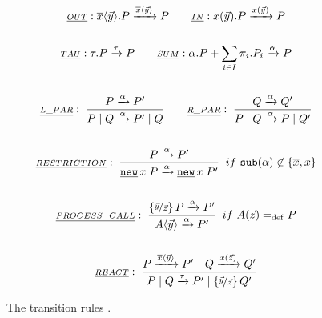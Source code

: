 \begin{figure}[H]
\begin{gather*}
\underline{\scriptstyle{OUT}}: \out{x}{\vec{y}}.P \transs{\out{x}{\vec{y}}} P
\quad\quad
\underline{\scriptstyle{IN}}: \inp{x}{\vec{y}}.P \transs{\inp{x}{\vec{y}}} P
\\\\
\underline{\scriptstyle{TAU}}: \tau.P \transs{\tau} P
\quad\quad
\underline{\scriptstyle{SUM}}: \procchoice{\alpha.P}{\procsum} \transs{\alpha} P
\\\\
\kalRule[]{L\_PAR}{}{P \transs{\alpha} P'}{\procpar{P}{Q} \transs{\alpha} \procpar{P'}{Q}}
\quad\quad
\kalRule[]{R\_PAR}{}{Q \transs{\alpha} Q'}{\procpar{P}{Q} \transs{\alpha} \procpar{P}{Q'}}
\\\\
\kalRule[if\ \sub{\alpha} \nin \{\overline{x},x\}]{RESTRICTION}{}{P \transs{\alpha} P'}{\procres{x}{P} \transs{\alpha} \procres{x}{P'}}
\\\\
\kalRule[if\ \procdef{A}{\vec{z}}\define{}P]{PROCESS\_CALL}{}{\substitue{\vec{y}}{\vec{z}}P \transs{\alpha} P'}{\proccall{A}{\vec{y}} \transs{\alpha} P'}
\\\\
\kalRule[]{REACT}{P \transs{\out{x}{\vec{y}}} P'}{Q \transs{\inp{x}{\vec{z}}} Q'}{\procpar{P}{Q} \transs{\tau} \procpar{P'}{\substitue{\vec{y}}{\vec{z}}Q'}}
\end{gather*}
\caption{The transition rules \cite{milner}.}
\label{fig_transition_rules}
\end{figure}

